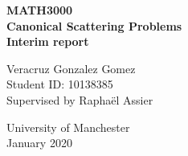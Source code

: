 \begin{titlepage}
   \begin{center}
       \vspace*{1cm}
 
       \textbf{MATH3000} \\
       \textbf{Canonical Scattering Problems}\\
       \textbf{Interim report}
 
       \vspace{1.5cm}
 
       Veracruz Gonzalez Gomez \\
       Student ID: 10138385 \\
       Supervised by Raphaël Assier \\
 
       \vfill
        
        University of Manchester\\
        January 2020 \\
 
   \end{center}
\end{titlepage}